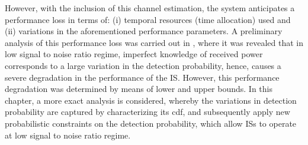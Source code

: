 However, with the inclusion of this channel estimation, the system anticipates a performance loss in terms of: (i) temporal resources (time allocation) used and (ii) variations in the aforementioned performance parameters. A preliminary analysis of this performance loss was carried out in \cite{Kaushik15_CC}, where it was revealed that in low signal to noise ratio regime, imperfect knowledge of received power corresponds to a large variation in the detection probability, hence, causes a severe degradation in the performance of the IS. However, this performance degradation was determined by means of lower and upper bounds. In this chapter, a more exact analysis is considered, whereby the variations in detection probability are captured by characterizing its cdf, and subsequently apply new probabilistic constraints on the detection probability, which allow ISs to operate at low signal to noise ratio regime. %



